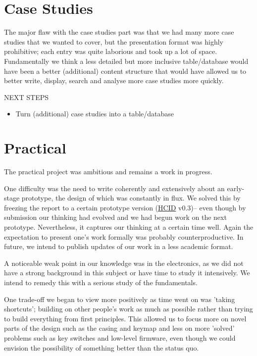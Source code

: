 \documentclass[logo,bsc,singlespacing,parskip]{infthesis}
\begin{document}
\section*{Case Studies}
\label{sec:org131877c}
The major flaw with the case studies part was that we had many more case studies that we wanted to cover, but the presentation format was highly prohibitive; each entry was quite laborious and took up a lot of space.
Fundamentally we think a less detailed but more inclusive table/database would have been a better (additional) content structure that would have allowed us to better write, display, search and analyse more case studies more quickly.

\begin{mdframed}
\begin{description}
\item[{NEXT STEPS}] 
\end{description}


\begin{itemize}
\item[{$\square$}] Turn (additional) case studies into a table/database
\end{itemize}
\end{mdframed}

\section*{Practical}
\label{sec:orgf26409e}
The practical project was ambitious and remains a work in progress.

One difficulty was the need to write coherently and extensively about an early-stage prototype, the design of which was constantly in flux.
We solved this by freezing the report to a certain prototype version (\hyperref[org0c83164]{HCID} v0.3)-- even though by submission our thinking had evolved and we had begun work on the next prototype.
Nevertheless, it captures our thinking at a certain time well.
Again the expectation to present one's work formally was probably counterproductive.
In future, we intend to publish updates of our work in a less academic format.

A noticeable weak point in our knowledge was in the electronics, as we did not have a strong background in this subject or have time to study it intensively.
We intend to remedy this with a serious study of the fundamentals.

One trade-off we began to view more positively as time went on was 'taking shortcuts'; building on other people's work as much as possible rather than trying to build everything from first principles.
This allowed us to focus more on novel parts of the design such as the casing and keymap and less on more 'solved' problems such as key switches and low-level firmware, even though we could envision the possibility of something better than the status quo.
\end{document}

